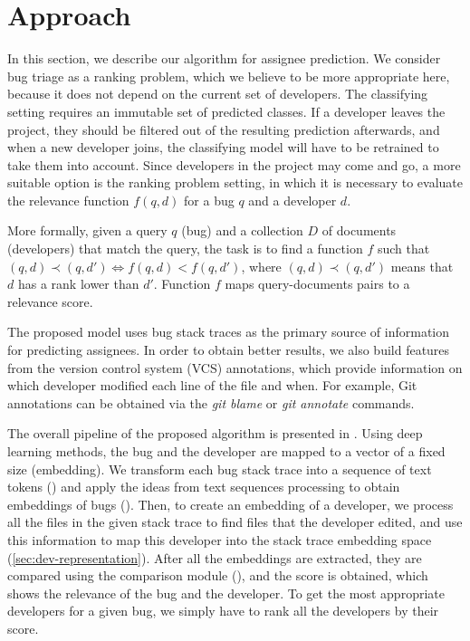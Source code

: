 \section{Approach}\label{sec:approach}

In this section, we describe our algorithm for assignee prediction. We consider bug triage as a ranking problem, which we believe to be more appropriate here, because it does not depend on the current set of developers. The classifying setting requires an immutable set of predicted classes. If a developer leaves the project, they should be filtered out of the resulting prediction afterwards, and when a new developer joins, the classifying model will have to be retrained to take them into account. Since developers in the project may come and go, a more suitable option is the ranking problem setting, in which it is necessary to evaluate the relevance function $f(q, d)$ for a bug $q$ and a developer $d$.

More formally, given a query $q$ (bug) and a collection $D$ of documents (developers) that match the query, the task is to find a function $f$ such that $(q, d) \prec (q, d') \Leftrightarrow f(q, d) < f(q, d')$, where $(q, d) \prec (q, d')$ means that $d$ has a rank lower than $d'$. Function $f$ maps query-documents pairs to a relevance score.

The proposed model uses bug stack traces as the primary source of information for predicting assignees. In order to obtain better results, we also build features from the version control system (VCS) annotations, which provide information on which developer modified each line of the file and when. For example, Git annotations can be obtained via the \textit{git blame} or \textit{git annotate} commands.

The overall pipeline of the proposed algorithm is presented in . Using deep learning methods, the bug and the developer are mapped to a vector of a fixed size (embedding). We transform each bug stack trace into a sequence of text tokens () and apply the ideas from text sequences processing to obtain embeddings of bugs (). Then, to create an embedding of a developer, we process all the files in the given stack trace to find files that the developer edited, and use this information to map this developer into the stack trace embedding space (\cref{sec:dev-representation}). After all the embeddings are extracted, they are compared using the comparison module (), and the score is obtained, which shows the relevance of the bug and the developer. To get the most appropriate developers for a given bug, we simply have to rank all the developers by their score. 

